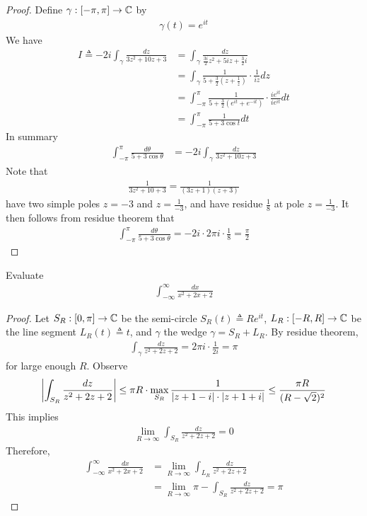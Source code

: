 \documentclass{report}
\begin{document}
\begin{proof}
Define $\gamma :[-\pi ,\pi ]\rightarrow \mathbb{C}$ by 
\begin{align*}
\gamma (t)=e^{it}
\end{align*}
We have 
\begin{align*}
I\triangleq -2i\int _{\gamma } \frac{dz}{3z^2+10z+3}&= \int_\gamma  \frac{dz}{\frac{3i}{2}z^2 + 5iz+ \frac{3}{2}i} \\
&=\int_{\gamma } \frac{1}{5+ \frac{3}{2}(z+ \frac{1}{z})} \cdot \frac{1}{iz} dz\\
&=\int_{-\pi }^{\pi } \frac{1}{5+ \frac{3}{2}(e^{it}+e^{-it})} \cdot \frac{ie^{ it}}{i e^{it}}dt \\
&=\int_{-\pi }^{\pi } \frac{1}{5+ 3 \cos t}dt
\end{align*}
In summary 
\begin{align*}
\int_{-\pi }^{\pi } \frac{d\theta}{5+ 3 \cos \theta}&= -2i \int_{\gamma } \frac{dz}{3z^2+10z+3} 
\end{align*}
Note that 
\begin{align*}
\frac{1}{3z^2+10+3}= \frac{1}{(3z+1)(z+3)}
\end{align*}
have two simple poles $z=-3$ and  $z= \frac{1}{-3}$, and have residue $\frac{1}{8}$ at pole $z=\frac{1}{-3}$. It then follows from residue theorem that 
\begin{align*}
\int_{-\pi }^{\pi } \frac{d\theta}{5+ 3 \cos \theta}= - 2i \cdot 2\pi  i \cdot \frac{1}{8}= \frac{\pi }{2} 
\end{align*}
\end{proof}
\begin{question}{}{}
Evaluate 
\begin{align*}
\int^{\infty}_{- \infty } \frac{dx}{x^2+2x+2}
\end{align*}
\end{question}
\begin{proof}
Let $S_R:[0 ,\pi ]\rightarrow \mathbb{C}$ be the semi-circle $S_R(t)\triangleq Re^{it}$, $L_R:[-R,R]\rightarrow \mathbb{C}$ be the line segment $L_R(t)\triangleq t$, and $\gamma$ the wedge $\gamma =S_R+L_R$. By residue theorem, 
\begin{align*}
\int_{\gamma } \frac{dz}{z^2+2z+2}= 2\pi i \cdot \frac{1}{2i}=\pi 
\end{align*}
for large enough $R$. Observe 
\begin{align*}
  \left|\int_{S_R} \frac{dz}{z^2+2z+2} \right|\leq \pi R \cdot \max_{S_R} \frac{1}{\left|z+1-i\right|\cdot \left|z+1+i\right|} \leq  \frac{\pi  R}{(R- \sqrt{2} )^2} 
\end{align*}
This implies 
\begin{align*}
\lim_{R\to \infty} \int_{S_R} \frac{dz}{z^2+2z+2}= 0
\end{align*}
Therefore, 
\begin{align*}
\int_{-\infty}^{\infty} \frac{dx}{x^2+2x+2}&= \lim_{R\to \infty}\int_{L_R} \frac{dz}{z^2+2z+2} \\
&=\lim_{R\to \infty} \pi  - \int_{S_R} \frac{dz}{z^2+2z+2}=\pi 
\end{align*}
\end{proof}
\end{document}
